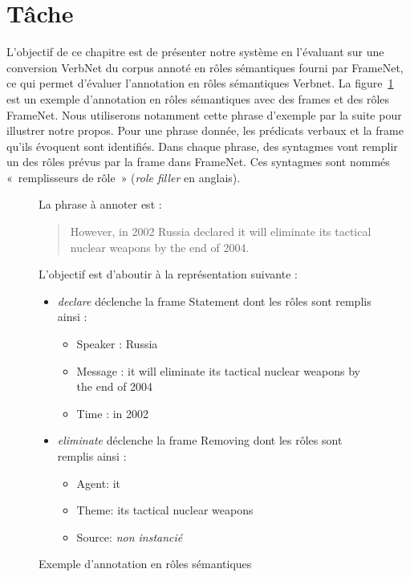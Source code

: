 \section{Tâche}

L'objectif de ce chapitre est de présenter notre système en l'évaluant sur une
conversion VerbNet du corpus annoté en rôles sémantiques fourni par FrameNet,
ce qui permet d'évaluer l'annotation en rôles sémantiques Verbnet. La
figure~\ref{fig:srlrussia} est un exemple d'annotation en rôles sémantiques
avec des frames et des rôles FrameNet. Nous utiliserons notamment cette phrase
d'exemple par la suite pour illustrer notre propos. Pour une phrase donnée, les
prédicats verbaux et la frame qu'ils évoquent sont identifiés. Dans chaque
phrase, des syntagmes vont remplir un des rôles prévus par la frame dans
FrameNet. Ces syntagmes sont nommés «~remplisseurs de rôle~» (\emph{role
filler} en anglais).

\begin{figure}[ht]
    La phrase à annoter est :

    \begin{quote}
    However, in 2002 Russia declared it will eliminate its tactical nuclear weapons by the end of 2004.
    \end{quote}

    L'objectif est d'aboutir à la représentation suivante :

    \begin{itemize}
        \item \emph{declare} déclenche la frame Statement dont les rôles sont remplis ainsi :
        \begin{itemize}
            \item Speaker : Russia
            \item Message : it will eliminate its tactical nuclear weapons by the end of 2004
            \item Time : in 2002
        \end{itemize}
        \item \emph{eliminate} déclenche la frame Removing dont les rôles sont remplis ainsi :
        \begin{itemize}
            \item Agent: it
            \item Theme: its tactical nuclear weapons
            \item Source: \emph{non instancié}
        \end{itemize}
    \end{itemize}
    \caption{\label{fig:srlrussia}Exemple d'annotation en rôles sémantiques}
\end{figure}

